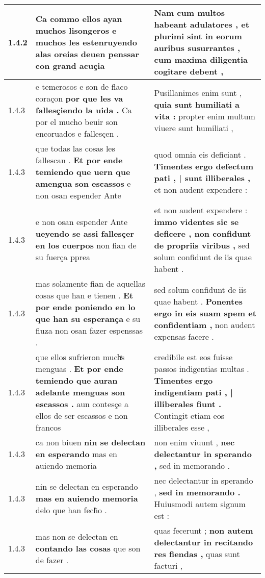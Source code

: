 \begin{tabular}{|p{1cm}|p{6.5cm}|p{6.5cm}|}
1.4.2 & Ca commo ellos ayan muchos lisongeros \textbf{ e muchos les estenruyendo alas oreias } deuen penssar con grand acuçia & Nam cum multos habeant adulatores , \textbf{ et plurimi sint in eorum auribus susurrantes , } cum maxima diligentia cogitare debent , \\\hline
1.4.3 & e temerosos e son de flaco coraçon \textbf{ por que les va fallesçiendo la uida . } Ca por el mucho beuir son encoruados e fallesçen . & Pusillanimes enim sunt , \textbf{ quia sunt humiliati a vita : } propter enim multum viuere sunt humiliati , \\\hline
1.4.3 & que todas las cosas les fallescan . \textbf{ Et por ende temiendo que uern que amengua son escassos } e non osan espender Ante & quod omnia eis deficiant . \textbf{ Timentes ergo defectum pati , | sunt illiberales , } et non audent expendere : \\\hline
1.4.3 & e non osan espender Ante \textbf{ ueyendo se assi fallesçer en los cuerpos } non fian de su fuerça pprea & et non audent expendere : \textbf{ immo videntes sic se deficere , non confidunt de propriis viribus , } sed solum confidunt de iis quae habent . \\\hline
1.4.3 & mas solamente fian de aquellas cosas que han e tienen . \textbf{ Et por ende poniendo en lo que han su esperança } e su fiuza non osan fazer espenssas . & sed solum confidunt de iis quae habent . \textbf{ Ponentes ergo in eis suam spem et confidentiam , } non audent expensas facere . \\\hline
1.4.3 & que ellos sufrieron muchͣs menguas . \textbf{ Et por ende temiendo que auran adelante menguas son escassos . } aun contesçe a ellos de ser escassos e non francos & credibile est eos fuisse passos indigentias multas . \textbf{ Timentes ergo indigentiam pati , | illiberales fiunt . } Contingit etiam eos illiberales esse , \\\hline
1.4.3 & ca non biuen \textbf{ nin se delectan en esperando } mas en auiendo memoria & non enim viuunt , \textbf{ nec delectantur in sperando , } sed in memorando . \\\hline
1.4.3 & nin se delectan en esperando \textbf{ mas en auiendo memoria } delo que han fech̃o . & nec delectantur in sperando , \textbf{ sed in memorando . } Huiusmodi autem signum est : \\\hline
1.4.3 & mas non se delectan en \textbf{ contando las cosas } que son de fazer . & quas fecerunt ; \textbf{ non autem delectantur in recitando res fiendas , } quas sunt facturi , \\\hline

\end{tabular}
